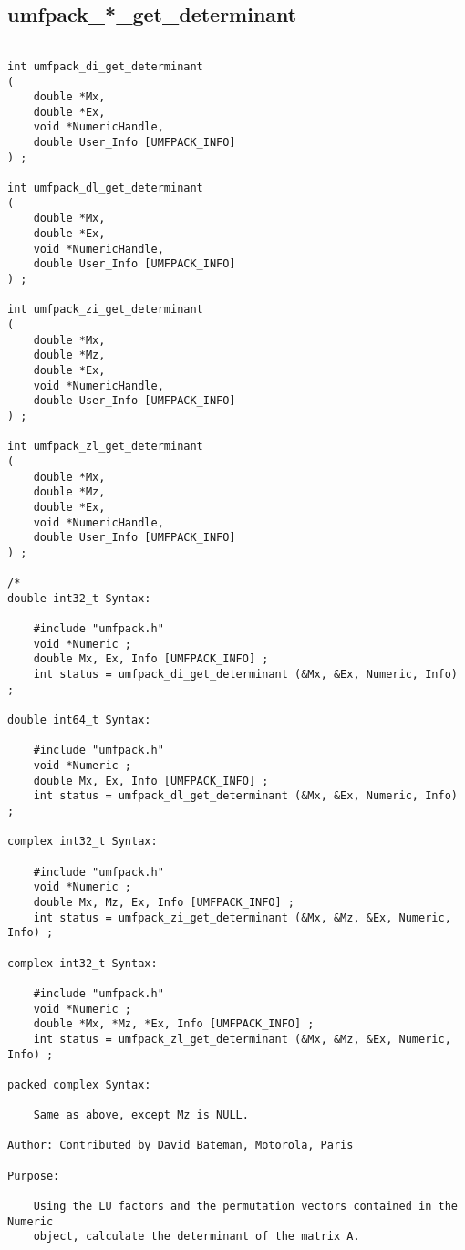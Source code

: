 \documentclass[11pt]{article}
\begin{document}
\newpage
\subsection{umfpack\_*\_get\_determinant}

{\footnotesize
\begin{verbatim}

int umfpack_di_get_determinant
(
    double *Mx,
    double *Ex,
    void *NumericHandle,
    double User_Info [UMFPACK_INFO]
) ;

int umfpack_dl_get_determinant
(
    double *Mx,
    double *Ex,
    void *NumericHandle,
    double User_Info [UMFPACK_INFO]
) ;

int umfpack_zi_get_determinant
(
    double *Mx,
    double *Mz,
    double *Ex,
    void *NumericHandle,
    double User_Info [UMFPACK_INFO]
) ;

int umfpack_zl_get_determinant
(
    double *Mx,
    double *Mz,
    double *Ex,
    void *NumericHandle,
    double User_Info [UMFPACK_INFO]
) ;

/*
double int32_t Syntax:

    #include "umfpack.h"
    void *Numeric ;
    double Mx, Ex, Info [UMFPACK_INFO] ;
    int status = umfpack_di_get_determinant (&Mx, &Ex, Numeric, Info) ;

double int64_t Syntax:

    #include "umfpack.h"
    void *Numeric ;
    double Mx, Ex, Info [UMFPACK_INFO] ;
    int status = umfpack_dl_get_determinant (&Mx, &Ex, Numeric, Info) ;

complex int32_t Syntax:

    #include "umfpack.h"
    void *Numeric ;
    double Mx, Mz, Ex, Info [UMFPACK_INFO] ;
    int status = umfpack_zi_get_determinant (&Mx, &Mz, &Ex, Numeric, Info) ;

complex int32_t Syntax:

    #include "umfpack.h"
    void *Numeric ;
    double *Mx, *Mz, *Ex, Info [UMFPACK_INFO] ;
    int status = umfpack_zl_get_determinant (&Mx, &Mz, &Ex, Numeric, Info) ;

packed complex Syntax:

    Same as above, except Mz is NULL.

Author: Contributed by David Bateman, Motorola, Paris

Purpose:

    Using the LU factors and the permutation vectors contained in the Numeric
    object, calculate the determinant of the matrix A.


\end{verbatim}}
\end{document}

